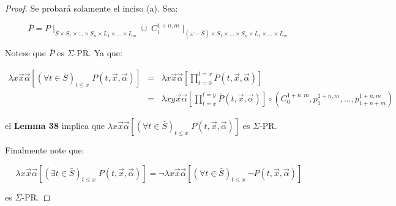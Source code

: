   \begin{proof}
    \par Se probará solamente el inciso (a). Sea:

    \[
      \bar{P} = P \mid_{\bar{S} \times S_{1} \times \dotsc \times S_{n} \times L_{1} \times \dotsc \times L_{m}} \cup \;
      C_{1}^{1+n,m} \mid_{(\omega -\bar{S}) \times S_{1} \times \dotsc \times S_{n} \times L_{1} \times \dotsc \times
      L_{m}}
    \]

    \par Notese que $\bar{P}$ es $\Sigma$-PR. Ya que:

    \begin{eqnarray}
      \nonumber \lambda x\vec{x}\vec{\alpha}\left[(\forall t \in \bar{S})_{t\leq x} \; P(t,\vec{x},\vec{\alpha})\right]
        &=& \lambda x\vec{x}\vec{\alpha}\left[\prod\limits_{t=0}^{t=x}\bar{P}(t,\vec{x},\vec{\alpha})\right] \\
      \nonumber &=& \lambda xy\vec{x}\vec{\alpha}\left[\prod\limits_{t=x}^{t=y} \bar{P}(t,\vec{x},\vec{\alpha})\right]
        \circ \left(C_{0}^{1+n,m}, p_{1}^{1+n,m}, \dotsc, p_{1+n+m}^{1+n,m}\right)
    \end{eqnarray}

    \par el \textbf{Lemma 38} implica que $\lambda x\vec{x}\vec{\alpha}\left[(\forall t\in \bar{S})_{t\leq x} \;
    P(t,\vec{x},\vec{\alpha})\right]$ es $\Sigma$-PR.

    \par Finalmente note que:

    \[
      \lambda x\vec{x}\vec{\alpha}\left[(\exists t \in \bar{S})_{t\leq x} \; P(t,\vec{x},\vec{\alpha})\right] = \lnot
      \lambda x\vec{x}\vec{\alpha}\left[(\forall t \in \bar{S})_{t\leq x} \; \lnot P(t,\vec{x},\vec{\alpha})\right]
    \]

    \par es $\Sigma$-PR.
  \end{proof}

